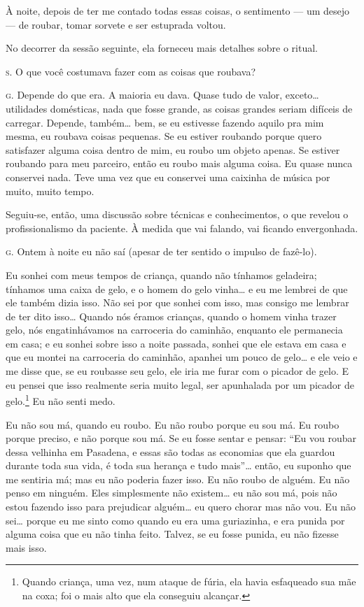 À noite, depois de ter me contado todas essas coisas, o sentimento ---
um desejo --- de roubar, tomar sorvete e ser estuprada voltou.\idxestup[|)]

No decorrer da sessão seguinte, ela forneceu mais detalhes sobre o
ritual.

\bigskip

\noindent\hskip0mm\textsc{s.} O que você costumava fazer com as coisas que roubava?

\noindent\hskip0mm\textsc{g.} Depende do que era. A maioria eu dava. Quase tudo de valor, exceto\ldots{}
utilidades domésticas, nada que fosse grande, as coisas grandes seriam
difíceis de carregar. Depende, também\ldots{} bem, se eu estivesse fazendo
aquilo pra mim mesma, eu roubava coisas pequenas. Se eu estiver
roubando porque quero satisfazer alguma coisa dentro de mim, eu roubo
um objeto apenas. Se estiver roubando para meu parceiro, então eu roubo
mais alguma coisa. Eu quase nunca conservei nada. Teve uma vez que eu
conservei uma caixinha de música por muito, muito tempo.

\bigskip

Seguiu-se, então, uma discussão sobre técnicas e conhecimentos, o
que revelou o profissionalismo da paciente. À medida que vai falando,
vai ficando envergonhada.

\bigskip

\noindent\hskip0mm\textsc{g.} Ontem à noite eu não saí (apesar de ter sentido o impulso de
fazê-lo).

 Eu sonhei com meus tempos de criança, quando não tínhamos geladeira;
tínhamos uma caixa de gelo, e o homem do gelo vinha\ldots{} e eu me lembrei
de que ele também dizia isso. Não sei por que sonhei com isso, mas
consigo me lembrar de ter dito isso\ldots{} Quando nós éramos crianças,
quando o homem vinha trazer gelo, nós engatinhávamos na carroceria do
caminhão, enquanto ele permanecia em casa; e eu sonhei sobre isso a
noite passada, sonhei que ele estava em casa e que eu montei na
carroceria do caminhão, apanhei um pouco de gelo\ldots{} e ele veio e me
disse que, se eu roubasse seu gelo, ele iria me furar com o picador de
gelo. E eu pensei que isso realmente seria muito legal, ser apunhalada
por um picador de gelo.\footnote{ Quando criança, uma vez, num ataque
de fúria, ela havia esfaqueado sua mãe na coxa; foi o mais alto que ela
conseguiu alcançar.} Eu não senti medo.

Eu não sou má, quando eu roubo. Eu não roubo porque eu sou má. Eu
roubo porque preciso, e não porque sou má. Se eu fosse sentar e pensar:
``Eu vou roubar dessa velhinha em Pasadena, e essas são
todas as economias que ela guardou durante toda sua vida, é toda sua
herança e tudo mais''\ldots{} então, eu suponho que me sentiria
má; mas eu não poderia fazer isso. Eu não roubo de alguém. Eu não penso
em ninguém. Eles simplesmente não existem\ldots{} eu não sou má, pois não
estou fazendo isso para prejudicar alguém\ldots{} eu quero chorar mas não
vou. Eu não sei\ldots{} porque eu me sinto como quando eu era uma
guriazinha, e era punida por alguma coisa que eu não tinha feito.
Talvez, se eu fosse punida, eu não fizesse mais isso.

